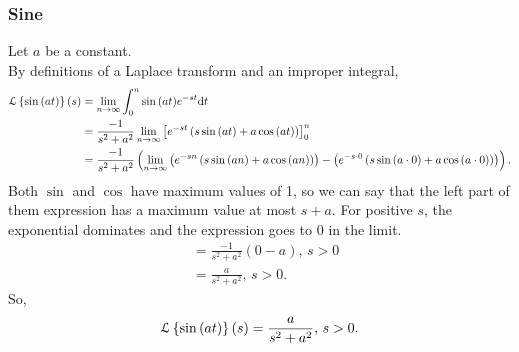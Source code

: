\noindent
\subsubsection{Sine}
Let $a$ be a constant.\\
By definitions of a Laplace transform and an improper integral,
\begin{align*}
	\mathcal{L}\left\{ \sin{(at)} \right\}\left(s\right) &= \lim\limits_{n\to\infty}{\int_{0}^{n}{\sin{(at)}e^{-st}\mathrm{d}t}} \\
	&= \frac{-1}{s^2 + a^2}\lim\limits_{n\to\infty}{\left[e^{-st}\left(s\sin{(at)} + a\cos{(at)}\right)\right]_{0}^{n}} \\
	&= \frac{-1}{s^2 + a^2}\left(\lim\limits_{n\to\infty}\left(e^{-sn}\left(s\sin{(an)} + a\cos{(an)}\right)\right) - \left(e^{-s\cdot 0}\left(s\sin{(a\cdot 0)} + a\cos{(a\cdot 0)}\right)\right)\right).
\end{align*}
Both $\sin$ and $\cos$ have maximum values of 1, so we can say that the left part of them expression has a maximum value at most $s + a$.
For positive $s$, the exponential dominates and the expression goes to 0 in the limit.
\begin{align*}
	&= \frac{-1}{s^2 + a^2}\left(0 - a\right) \text{, } s > 0 \\
	&= \frac{a}{s^2 + a^2} \text{, } s > 0.
\end{align*}
So,
\begin{equation*}
	\mathcal{L}\left\{ \sin{(at)} \right\}\left(s\right) = \frac{a}{s^2 + a^2} \text{, } s > 0.
\end{equation*}